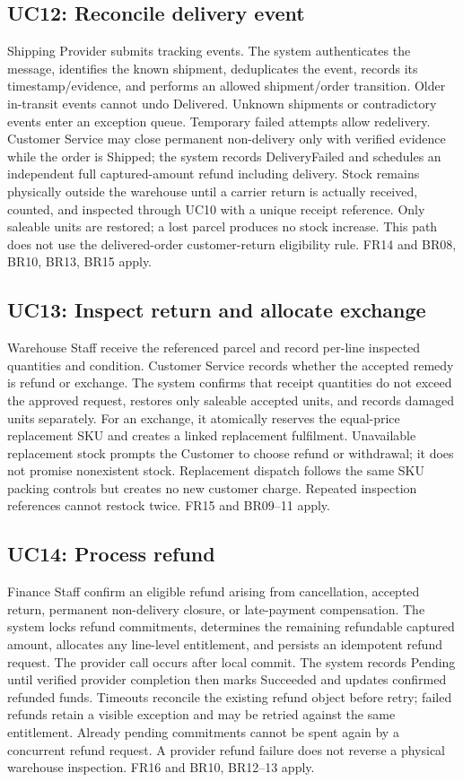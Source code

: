 \subsection{UC12: Reconcile delivery event}
Shipping Provider submits tracking events. The system authenticates the message, identifies the known shipment, deduplicates the event, records its timestamp/evidence, and performs an allowed shipment/order transition. Older in-transit events cannot undo Delivered. Unknown shipments or contradictory events enter an exception queue. Temporary failed attempts allow redelivery. Customer Service may close permanent non-delivery only with verified evidence while the order is Shipped; the system records DeliveryFailed and schedules an independent full captured-amount refund including delivery. Stock remains physically outside the warehouse until a carrier return is actually received, counted, and inspected through UC10 with a unique receipt reference. Only saleable units are restored; a lost parcel produces no stock increase. This path does not use the delivered-order customer-return eligibility rule. FR14 and BR08, BR10, BR13, BR15 apply.

\subsection{UC13: Inspect return and allocate exchange}
Warehouse Staff receive the referenced parcel and record per-line inspected quantities and condition. Customer Service records whether the accepted remedy is refund or exchange. The system confirms that receipt quantities do not exceed the approved request, restores only saleable accepted units, and records damaged units separately. For an exchange, it atomically reserves the equal-price replacement SKU and creates a linked replacement fulfilment. Unavailable replacement stock prompts the Customer to choose refund or withdrawal; it does not promise nonexistent stock. Replacement dispatch follows the same SKU packing controls but creates no new customer charge. Repeated inspection references cannot restock twice. FR15 and BR09--11 apply.

\subsection{UC14: Process refund}
Finance Staff confirm an eligible refund arising from cancellation, accepted return, permanent non-delivery closure, or late-payment compensation. The system locks refund commitments, determines the remaining refundable captured amount, allocates any line-level entitlement, and persists an idempotent refund request. The provider call occurs after local commit. The system records Pending until verified provider completion then marks Succeeded and updates confirmed refunded funds. Timeouts reconcile the existing refund object before retry; failed refunds retain a visible exception and may be retried against the same entitlement. Already pending commitments cannot be spent again by a concurrent refund request. A provider refund failure does not reverse a physical warehouse inspection. FR16 and BR10, BR12--13 apply.

